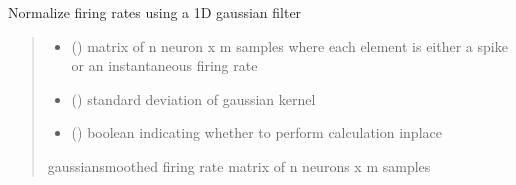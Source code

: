 \documentclass[letterpaper,10pt,english]{sphinxmanual}
\begin{document}
\begin{fulllineitems}
\label{\detokenize{CalSciPy.event_processing:CalSciPy.event_processing.gaussian_smooth_firing_rates}}
\pysigstartsignatures
{}
\pysigstopsignatures
\sphinxAtStartPar
Normalize firing rates using a 1\sphinxhyphen{}D gaussian filter
\begin{quote}\begin{description}
\begin{itemize}
\item {} 
\sphinxAtStartPar
{} () \sphinxhyphen{}\sphinxhyphen{} matrix of n neuron x m samples where each element is either a spike or an
instantaneous firing rate

\item {} 
\sphinxAtStartPar
{} () \sphinxhyphen{}\sphinxhyphen{} standard deviation of gaussian kernel

\item {} 
\sphinxAtStartPar
{} () \sphinxhyphen{}\sphinxhyphen{} boolean indicating whether to perform calculation in\sphinxhyphen{}place

\end{itemize}

\sphinxAtStartPar
gaussian\sphinxhyphen{}smoothed firing rate matrix of n neurons x m samples

\sphinxAtStartPar
{}

\end{description}\end{quote}

\end{fulllineitems}
\end{document}
